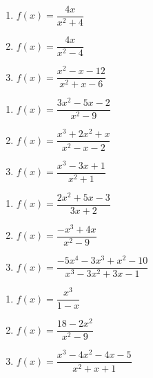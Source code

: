 \begin{multicols}{3}
\begin{enumerate}
\setcounter{enumi}{\value{HW}}

\item $f(x) = \dfrac{4x}{x^2+4}$
\item $f(x) = \dfrac{4x}{x^2-4}$
\item $f(x) = \dfrac{x^2-x-12}{x^2+x-6}$

\setcounter{HW}{\value{enumi}}
\end{enumerate}
\end{multicols}

\begin{multicols}{3}
\begin{enumerate}
\setcounter{enumi}{\value{HW}}

\item $f(x) = \dfrac{3x^2-5x-2}{x^2-9}$
\item $f(x) = \dfrac{x^3+2x^2+x}{x^2-x-2}$
\item $f(x) = \dfrac{x^{3} - 3x + 1}{x^{2} + 1}$

\setcounter{HW}{\value{enumi}}
\end{enumerate}
\end{multicols}

\begin{multicols}{3}
\begin{enumerate}
\setcounter{enumi}{\value{HW}}

\item $f(x) = \dfrac{2x^{2} + 5x - 3}{3x + 2}$
\item $f(x) = \dfrac{-x^{3} + 4x}{x^{2} - 9}$
\item \small $f(x) = \dfrac{-5x^{4} - 3x^{3} + x^{2} - 10}{x^{3} - 3x^{2} + 3x - 1}$ \normalsize 

\setcounter{HW}{\value{enumi}}
\end{enumerate}
\end{multicols}


\begin{multicols}{3}
\begin{enumerate}
\setcounter{enumi}{\value{HW}}

\item $f(x) = \dfrac{x^3}{1-x}$
\item $f(x) = \dfrac{18-2x^2}{x^2-9}$
\item $f(x) = \dfrac{x^3-4x^2-4x-5}{x^2+x+1}$ \label{alltheasymplast}


\setcounter{HW}{\value{enumi}}
\end{enumerate}
\end{multicols}

